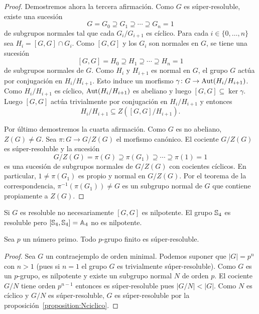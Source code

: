 \begin{proof}
	Demostremos ahora la tercera afirmación. Como $G$ es súper-resoluble, existe
	una sucesión
	\[
	G=G_0\supseteq G_1\supseteq\cdots\supseteq G_n=1
	\]
	de subgrupos normales tal que cada $G_i/G_{i+1}$ es cíclico. Para cada
	$i\in\{0,\dots,n\}$ sea $H_i=[G,G]\cap G_i$. Como $[G,G]$ y los $G_i$ son
	normales en $G$, se tiene una sucesión
	\[
	[G,G]=H_0\supseteq H_1\supseteq\cdots\supseteq H_n=1
	\]
	de subgrupos normales de $G$. Como $H_i$ y $H_{i+1}$ es normal en $G$, el
	grupo $G$ actúa por conjugación en $H_i/H_{i+1}$. Esto induce un morfismo
	$\gamma\colon G\to\operatorname{Aut}(H_i/H_{i+1})$. Como $H_i/H_{i+1}$ es cíclico, 
	$\operatorname{Aut}(H_i/H_{i+1})$ es abeliano y luego $[G,G]\subseteq\ker \gamma$. Luego
	$[G,G]$ actúa trivialmente por conjugación en $H_{i}/H_{i+1}$ y entonces
	\[
	H_i/H_{i+1}\subseteq Z([G,G]/H_{i+1}).
	\]

	Por último demostremos la cuarta afirmación. Como $G$ es no abeliano,
	$Z(G)\ne G$. Sea $\pi\colon G\to G/Z(G)$ el morfismo canónico.  El cociente
	$G/Z(G)$ es súper-resoluble y la sucesión
	\[
	G/Z(G)=\pi(G)\supseteq \pi(G_1)\supseteq\cdots\supseteq \pi(1)=1
	\]
	es una sucesión de subgrupos normales de $G/Z(G)$ con cocientes cíclicos.
	En particular, $1\ne \pi(G_1)$ es propio y normal en $G/Z(G)$.  Por el
	teorema de la correspondencia, $\pi^{-1}(\pi(G_1))\ne G$ es un subgrupo normal
	de $G$ que contiene propiamente a $Z(G)$. 
\end{proof}

\begin{example}
	Si $G$ es resoluble no necesariamente $[G,G]$ es nilpotente. El grupo
	$\mathbb{S}_4$ es resoluble pero $[\mathbb{S}_4,\mathbb{S}_4]=\mathbb{A}_4$ no es nilpotente.
\end{example}

\begin{proposition}
	\label{proposition:psuper}
	Sea $p$ un número primo.  Todo $p$-grupo finito es súper-resoluble.
\end{proposition}

\begin{proof}
	Sea $G$ un contraejemplo de orden minimal. Podemos suponer que $|G|=p^n$
	con $n>1$ (pues si $n=1$ el grupo $G$ es trivialmente súper-resoluble).
	Como $G$ es un $p$-grupo, es nilpotente  y existe un subgrupo normal $N$ de
	orden $p$. El cociente $G/N$ tiene orden $p^{n-1}$ entonces es
	súper-resoluble pues $|G/N|<|G|$. Como $N$ es cíclico y $G/N$ es
	súper-resoluble, $G$ es súper-resoluble por la
	proposición~\ref{proposition:Nciclico}.
\end{proof}

